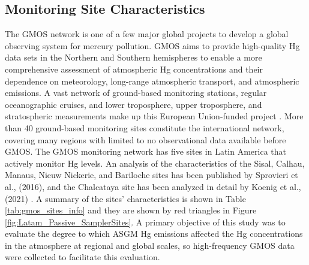 \subsection{Monitoring Site Characteristics}
\begin{flushleft}
 The GMOS network is one of a few major global projects to develop a global observing system for mercury pollution. GMOS aims to provide high-quality Hg data sets in the Northern and Southern hemispheres to enable a more comprehensive assessment of atmospheric Hg concentrations and their dependence on meteorology, long-range atmospheric transport, and atmospheric emissions\cite{sprovieri_atmospheric_2016}. A vast network of ground-based monitoring stations, regular oceanographic cruises, and lower troposphere, upper troposphere, and stratospheric measurements make up this European Union-funded project \cite{koenig_seasonal_2021,sprovieri_atmospheric_2016}. More than 40 ground-based monitoring sites constitute the international network, covering many regions with limited to no observational data available before GMOS\cite{sprovieri_atmospheric_2016}. The GMOS monitoring network has five sites in Latin America that actively monitor Hg levels. An analysis of the characteristics of the Sisal, Calhau, Manaus, Nieuw Nickerie, and Bariloche sites has been published by Sprovieri et al., (2016), and the Chalcataya site has been analyzed in detail by Koenig et al., (2021) \cite{koenig_seasonal_2021,sprovieri_atmospheric_2016}. A summary of the sites' characteristics is shown in Table \ref{tab:gmos_sites_info}  and they are shown by red triangles in Figure \ref{fig:Latam_Passive_SamplerSites}. A primary objective of this study was to evaluate the degree to which ASGM Hg emissions affected the Hg concentrations in the atmosphere at regional and global scales, so high-frequency GMOS data were collected to facilitate this evaluation.
  \end{flushleft}
  
